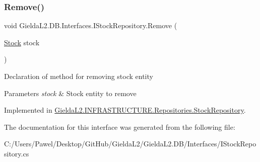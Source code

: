 \subsubsection{\texorpdfstring{Remove()}{Remove()}}
{\footnotesize\ttfamily void Gielda\+L2.\+D\+B.\+Interfaces.\+I\+Stock\+Repository.\+Remove (\begin{DoxyParamCaption}\item[{\mbox{\hyperlink{class_gielda_l2_1_1_d_b_1_1_entities_1_1_stock}{Stock}}}]{stock }\end{DoxyParamCaption})}



Declaration of method for removing stock entity 


\begin{DoxyParams}{Parameters}
{\em stock} & Stock entity to remove\\
\hline
\end{DoxyParams}


Implemented in \mbox{\hyperlink{class_gielda_l2_1_1_i_n_f_r_a_s_t_r_u_c_t_u_r_e_1_1_repositories_1_1_stock_repository_a939060d75ec4eda1c1d8a0f8824a088f}{Gielda\+L2.\+I\+N\+F\+R\+A\+S\+T\+R\+U\+C\+T\+U\+R\+E.\+Repositories.\+Stock\+Repository}}.



The documentation for this interface was generated from the following file\+:\begin{DoxyCompactItemize}
\item 
C\+:/\+Users/\+Pawel/\+Desktop/\+Git\+Hub/\+Gielda\+L2/\+Gielda\+L2.\+D\+B/\+Interfaces/I\+Stock\+Repository.\+cs\end{DoxyCompactItemize}
